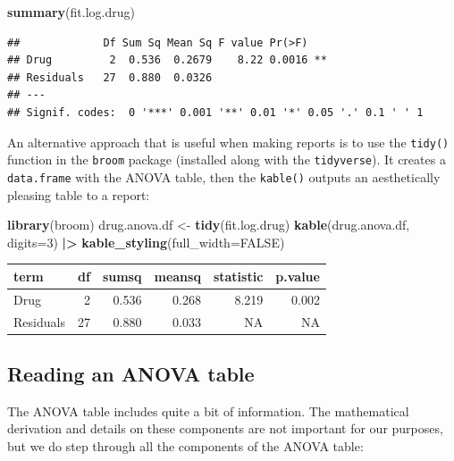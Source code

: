 \documentclass[
]{book}
\newenvironment{Shaded}{\begin{snugshade}}{\end{snugshade}}
\newcommand{\AttributeTok}[1]{\textcolor[rgb]{0.13,0.29,0.53}{#1}}
\newcommand{\ConstantTok}[1]{\textcolor[rgb]{0.56,0.35,0.01}{#1}}
\newcommand{\DecValTok}[1]{\textcolor[rgb]{0.00,0.00,0.81}{#1}}
\newcommand{\FunctionTok}[1]{\textcolor[rgb]{0.13,0.29,0.53}{\textbf{#1}}}
\newcommand{\NormalTok}[1]{#1}
\newcommand{\OtherTok}[1]{\textcolor[rgb]{0.56,0.35,0.01}{#1}}
\newcommand{\SpecialCharTok}[1]{\textcolor[rgb]{0.81,0.36,0.00}{\textbf{#1}}}
\begin{document}
\begin{Shaded}
\begin{Highlighting}[]
\FunctionTok{summary}\NormalTok{(fit.log.drug)}
\end{Highlighting}
\end{Shaded}

\begin{verbatim}
##             Df Sum Sq Mean Sq F value Pr(>F)   
## Drug         2  0.536  0.2679    8.22 0.0016 **
## Residuals   27  0.880  0.0326                  
## ---
## Signif. codes:  0 '***' 0.001 '**' 0.01 '*' 0.05 '.' 0.1 ' ' 1
\end{verbatim}

An alternative approach that is useful when making reports is to use the \texttt{tidy()} function in the \texttt{broom} package \citep{R-broom} (installed along with the \texttt{tidyverse}).
It creates a \texttt{data.frame} with the ANOVA table, then the \texttt{kable()} outputs an aesthetically pleasing table to a report:

\begin{Shaded}
\begin{Highlighting}[]
\FunctionTok{library}\NormalTok{(broom)}
\NormalTok{drug.anova.df }\OtherTok{\textless{}{-}} \FunctionTok{tidy}\NormalTok{(fit.log.drug)}
\FunctionTok{kable}\NormalTok{(drug.anova.df, }\AttributeTok{digits=}\DecValTok{3}\NormalTok{) }\SpecialCharTok{|\textgreater{}}
  \FunctionTok{kable\_styling}\NormalTok{(}\AttributeTok{full\_width=}\ConstantTok{FALSE}\NormalTok{)}
\end{Highlighting}
\end{Shaded}

\begin{table}
\centering
\begin{tabular}{l|r|r|r|r|r}
\hline
term & df & sumsq & meansq & statistic & p.value\\
\hline
Drug & 2 & 0.536 & 0.268 & 8.219 & 0.002\\
\hline
Residuals & 27 & 0.880 & 0.033 & NA & NA\\
\hline
\end{tabular}
\end{table}

\hypertarget{reading-an-anova-table}{%
\subsection{Reading an ANOVA table}\label{reading-an-anova-table}}

The ANOVA table includes quite a bit of information.
The mathematical derivation and details on these components are not important for our purposes, but we do step through all the components of the ANOVA table:
\end{document}
